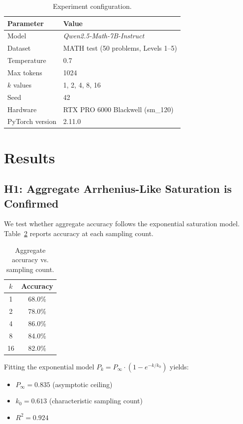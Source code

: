 \documentclass{article}
\begin{document}
\begin{table}[t]
\caption{Experiment configuration.}
\label{tab:config}
\centering
\begin{tabular}{ll}
\toprule
Parameter & Value \\
\midrule
Model & \textit{Qwen2.5-Math-7B-Instruct} \\
Dataset & MATH test (50 problems, Levels 1--5) \\
Temperature & 0.7 \\
Max tokens & 1024 \\
$k$ values & 1, 2, 4, 8, 16 \\
Seed & 42 \\
Hardware & RTX PRO 6000 Blackwell (sm\_120) \\
PyTorch version & 2.11.0 \\
\bottomrule
\end{tabular}
\end{table}

\section{Results}
\label{sec:results}

\subsection{H1: Aggregate Arrhenius-Like Saturation is Confirmed}

We test whether aggregate accuracy follows the exponential saturation model. Table~\ref{tab:accuracy} reports accuracy at each sampling count.

\begin{table}[t]
\caption{Aggregate accuracy vs. sampling count.}
\label{tab:accuracy}
\centering
\begin{tabular}{cc}
\toprule
$k$ & Accuracy \\
\midrule
1 & 68.0\% \\
2 & 78.0\% \\
4 & 86.0\% \\
8 & 84.0\% \\
16 & 82.0\% \\
\bottomrule
\end{tabular}
\end{table}

Fitting the exponential model $P_k = P_\infty \cdot (1 - e^{-k/k_0})$ yields:
\begin{itemize}
\item $P_\infty = 0.835$ (asymptotic ceiling)
\item $k_0 = 0.613$ (characteristic sampling count)
\item $R^2 = 0.924$
\end{itemize}
\end{document}
